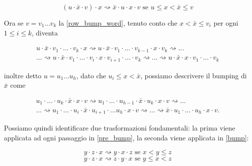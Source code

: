 \begin{equation}\label{row_bump_word}
(u \cdot \bar x \cdot v) \cdot x \rightsquigarrow \bar x \cdot u \cdot
  x \cdot v \mbox{ se } u \leq x < \bar x \leq v
\end{equation}

Ora se $v=v_1 \ldots v_k$ la \eqref{row_bump_word}, tenuto conto che
$x < \bar x \leq v_i$ per ogni $1 \leq i \leq k$, diventa

\begin{equation}\label{pre_bump}
\begin{split}
u \cdot \bar x \cdot v_1 \cdot \ldots \cdot v_k \cdot x
\rightsquigarrow u \cdot \bar x \cdot v_1 \cdot \ldots \cdot v_{k-1}
\cdot x \cdot v_k \rightsquigarrow \ldots\\
\ldots \rightsquigarrow u \cdot \bar x \cdot v_1 \cdot \ldots \cdot
v_i \cdot x \cdot v_{i+1} \cdot \ldots \cdot v_k \rightsquigarrow \ldots
\rightsquigarrow u \cdot \bar x \cdot x \cdot v_1 \cdot \ldots \cdot v_k
\end{split}
\end{equation}

inoltre detto $u=u_1 \ldots u_h$, dato che $u_i \leq x < \bar x$, possiamo
descrivere il bumping di $\bar x$ come

\begin{equation}\label{bump}
\begin{split}
u_1 \cdot \ldots \cdot u_k \cdot \bar x \cdot x \cdot v
\rightsquigarrow u_1 \cdot \ldots \cdot u_{h-1} \cdot \bar x \cdot u_k
\cdot x \cdot v \rightsquigarrow \ldots\\
\ldots \rightsquigarrow u_1 \cdot \ldots \cdot u_i \cdot \bar x \cdot
u_{i+1} \cdot \ldots u_h \cdot x \cdot v \rightsquigarrow \ldots
\rightsquigarrow \bar x \cdot u_1 \cdot \ldots \cdot u_h \cdot x \cdot v.
\end{split}
\end{equation}

Possiamo quindi identificare due trasformazioni fondamentali: la prima
viene applicata ad ogni passaggio in \eqref{pre_bump}, la seconda
viene applicata in \eqref{bump}:

\begin{equation}\label{k1}\tag{$K_1$}
y \cdot z \cdot x \rightsquigarrow y \cdot x \cdot z \mbox{ se } x < y
\leq z
\end{equation}
\begin{equation}\label{k2}\tag{$K_2$}
y \cdot z \cdot x \rightsquigarrow z \cdot y \cdot x \mbox{ se } y
\leq x < z
\end{equation}

